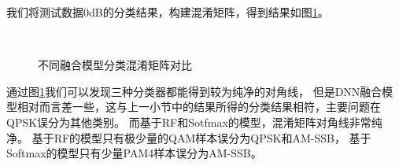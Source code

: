 我们将测试数据0dB的分类结果，构建混淆矩阵，得到结果如图\ref{sec:fig_4_6}。\par
\begin{figure}[h]
	\centering
	\\
	\caption{不同融合模型分类混淆矩阵对比}
	\label{sec:fig_4_6}
\end{figure}

通过图\ref{sec:fig_4_6}我们可以发现三种分类器都能得到较为纯净的对角线，
但是DNN融合模型相对而言差一些，这与上一小节中的结果所得的分类结果相符，主要问题在QPSK误分为其他类别。
而基于RF和Sotfmax的模型，混淆矩阵对角线非常纯净。
基于RF的模型只有极少量的QAM样本误分为QPSK和AM-SSB，
基于Softmax的模型只有少量PAM4样本误分为AM-SSB。\par

